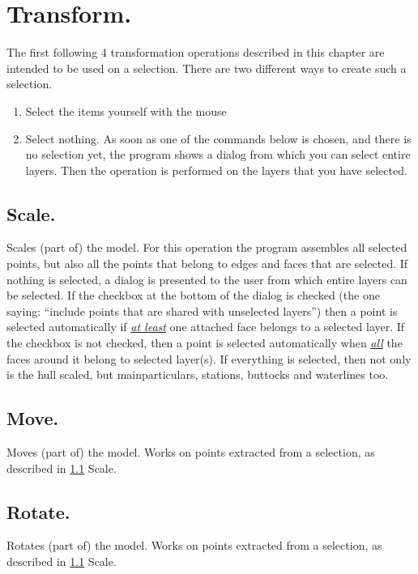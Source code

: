 \documentclass[12pt]{article}
\begin{document}
\pagebreak

\section{Transform.}
The first following 4 transformation operations described in this chapter are intended to be used on
a selection. There are two different ways to create such a selection.

\begin{enumerate}

\item Select the items yourself with the mouse

\item Select nothing. As soon as one of the commands below is chosen, and there is no
selection yet, the program shows a dialog from which you can select entire layers. Then the
operation is performed on the layers that you have selected.

\end{enumerate}

\subsection{Scale.} \label{scale}
Scales (part of) the model. For this operation the program assembles
all selected points, but also all the points that belong to edges and
faces that are selected. If nothing is selected, a dialog is presented
to the user from which entire layers can be selected. If the checkbox
at the bottom of the dialog is checked (the one saying: “include
points that are shared with unselected layers”) then a point is
selected automatically if \underline{\textit{at least}} one attached face belongs to a
selected layer. If the checkbox is not checked, then a point is
selected automatically when \underline{\textit{all}} the faces around it belong to selected
layer(s). If everything is selected, then not only is the hull scaled,
but mainparticulars, stations, buttocks and waterlines too.

\subsection{Move.}
Moves (part of) the model. Works on points extracted from a selection,
as described in \ref{scale} Scale.

\subsection{Rotate.}
Rotates (part of) the model. Works on points extracted from a
selection, as described in \ref{scale} Scale.
\end{document}
